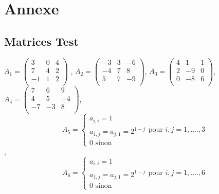 \chapter*{Annexe}
\label{annexe}
\section*{Matrices Test}
$A_1 = \begin{pmatrix}
    3&0&4\\
    7&4&2\\
    -1&1&2\\
    \end{pmatrix}
    $
    ,
    $A_2 = \begin{pmatrix}
    -3&3&-6\\
    -4&7&8\\
    5&7&-9\\
    \end{pmatrix}
    $,
    $A_3 = \begin{pmatrix}
    4&1&1\\
    2&-9&0\\
    0&-8&6\\
    \end{pmatrix}
    $,
    $A_4 = \begin{pmatrix}
    7&6&9\\
    4&5&-4\\
    -7&-3&8\\
    \end{pmatrix}
    $,\vspace{6pt}\\
    \begin{equation*}
        A_5=
        \begin{cases}
            a_{i,i}=1 \\
            a_{1,j}=a_{j,1}=2^{1-j}\\
            0 \text{ sinon}
        \end{cases} \text{pour }i,j=1,....,3
    \end{equation*}
    ,\\
    \begin{equation*}
        A_6=
        \begin{cases}
            a_{i,i}=1 \\
            a_{1,j}=a_{j,1}=2^{1-j}\\
            0 \text{ sinon}
        \end{cases} \text{pour }i,j=1,....,6
    \end{equation*}
